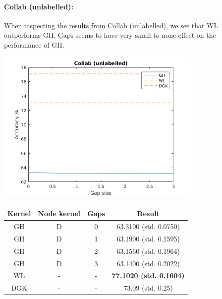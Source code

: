 \documentclass{article}
\begin{document}
\paragraph{Collab (unlabelled):}
When inspecting the results from Collab (unlabelled), we see that WL outperforms GH. Gaps seems to have very small to none effect on the performance of GH. \\
\begin{minipage}{0.6\linewidth}
	\hspace*{-1in}
	\includegraphics[width=10cm]{collab_unlabelled}
	\label{fig:collab_unlabelled}
\end{minipage}
\begin{minipage}[c]{0.5\linewidth}
	
	\centering
	\begin{tabular}{c|c|c|c}
		Kernel & Node kernel & Gaps & Result\\
		\hline
		GH & D & 0 & 63.3100 (std. 0.0750) \\
		GH & D & 1 & 63.1900 (std. 0.1595) \\
		GH & D & 2 & 63.1560 (std. 0.1964) \\
		GH & D & 3 & 63.1400 (std. 0.2022) \\
		WL & - & - & \textbf{77.1020 (std. 0.1604)}  \\
		DGK\cite{yanardag} & - & - & 73.09 (std. 0.25)
	\end{tabular}
	\label{table:collab_unlabelled}
\end{minipage}
\end{document}
